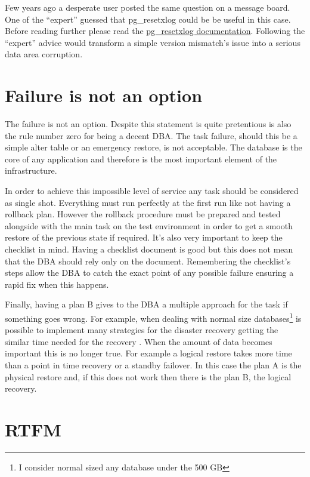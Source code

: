 Few years ago a desperate user posted the same question on a message board. One of the ``expert'' 
guessed that pg\_resetxlog could be be useful in this case. Before reading further please read the 
\href{http://www.postgresql.org/docs/9.3/static/app-pgresetxlog.html}{pg\_resetxlog documentation}. 
Following the ``expert'' advice would transform a simple version mismatch's issue into a serious 
data area corruption. 

\section{Failure is not an option}
The failure is not an option. Despite this statement is quite pretentious is also the rule number 
zero for being a decent DBA. The task failure, should this be a simple alter table or an emergency 
restore, is not acceptable. The database is the core of any application and therefore is the most important 
element of the infrastructure.\newline

In order to achieve this impossible level of service any task should be considered as single shot. 
Everything must run perfectly at the first run like not having a rollback plan. However the rollback 
procedure must be prepared and tested alongside with the main task on the test environment in order to get a 
smooth restore of the previous state if required. It's also very important to keep the checklist in mind. 
Having a checklist document is good but this does not mean that the DBA should rely only on the 
document. Remembering the checklist's steps allow the DBA to catch the exact point of any possible failure 
ensuring a rapid fix when this happens.\newline

Finally, having a plan B gives to the DBA a multiple approach for the task if something goes wrong. For 
example, when dealing with normal size databases\footnote{I consider normal sized any database under the 500 
GB} is possible to implement many strategies for the disaster recovery getting the similar time needed for 
the recovery . When the amount of data becomes important this is no longer true. For example a logical 
restore takes more time than a point in time recovery or a standby failover. In this case the plan A is the 
physical restore and, if this does not work then there is the plan B, the logical recovery.

\section{RTFM}